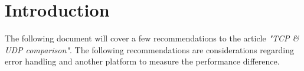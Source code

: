 \section{Introduction}

The following document will cover a few recommendations to the article \emph{"TCP \& UDP comparison"}\cite{tcp_vs_udp}. The following recommendations are considerations regarding error handling and another platform to measure the performance difference.